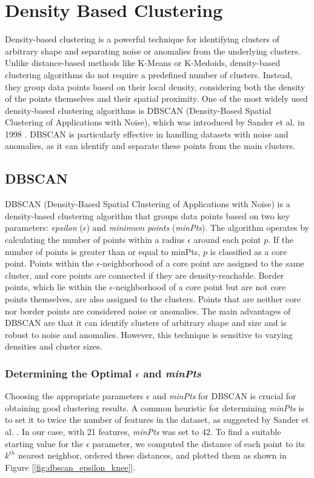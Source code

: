 \documentclass[a4paper]{article}
\begin{document}
\section{Density Based Clustering}
Density-based clustering is a powerful technique for identifying clusters of arbitrary shape and separating noise or anomalies from the underlying clusters. Unlike distance-based methods like K-Means or K-Medoids, density-based clustering algorithms do not require a predefined number of clusters. Instead, they group data points based on their local density, considering both the density of the points themselves and their spatial proximity.
One of the most widely used density-based clustering algorithms is DBSCAN (Density-Based Spatial Clustering of Applications with Noise), which was introduced by Sander et al. in 1998 \cite{Sander-etal98}. DBSCAN is particularly effective in handling datasets with noise and anomalies, as it can identify and separate these points from the main clusters.

\subsection{DBSCAN}
DBSCAN (Density-Based Spatial Clustering of Applications with Noise) is a density-based clustering algorithm that groups data points based on two key parameters: \textit{epsilon} ($\epsilon$) and \textit{minimum points} (\textit{minPts}). The algorithm operates by calculating the number of points within a radius $\epsilon$ around each point $p$. If the number of points is greater than or equal to minPts, $p$ is classified as a core point. Points within the $\epsilon$-neighborhood of a core point are assigned to the same cluster, and core points are connected if they are density-reachable. Border points, which lie within the $\epsilon$-neighborhood of a core point but are not core points themselves, are also assigned to the clusters. Points that are neither core nor border points are considered noise or anomalies. \newline
The main advantages of DBSCAN are that it can identify clusters of arbitrary shape and size and is robust to noise and anomalies. However, this technique is sensitive to varying densities and cluster sizes.
\subsubsection{Determining the Optimal $\epsilon$ and \textit{minPts}}
Choosing the appropriate parameters $\epsilon$ and \textit{minPts} for DBSCAN is crucial for obtaining good clustering results. A common heuristic for determining \textit{minPts} is to set it to twice the number of features in the dataset, as suggested by Sander et al. \cite{Sander-etal98}. In our case, with 21 features, \textit{minPts} was set to 42. \newline
To find a suitable starting value for the $\epsilon$ parameter, we computed the distance of each point to its $k^{th}$ nearest neighbor, ordered these distances, and plotted them as shown in Figure [\ref{fig:dbscan_epsilon_knee}]. 
\end{document}
